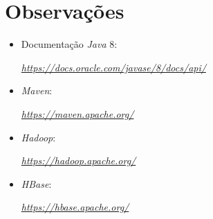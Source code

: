 \documentclass[a4paper]{report}
\begin{document}
	\appendix
	\chapter{Observações} \label{ch:Observations}
	\begin{itemize}
		\item Documentação \textit{Java} 8:
		\par \textit{\url{https://docs.oracle.com/javase/8/docs/api/}}
		\item \textit{Maven}:
		\par \textit{\url{https://maven.apache.org/}}
		\item \textit{Hadoop}:
		\par \textit{\url{https://hadoop.apache.org/}}
		\item \textit{HBase}:
		\par \textit{\url{https://hbase.apache.org/}}
	\end{itemize}
	
\end{document}
